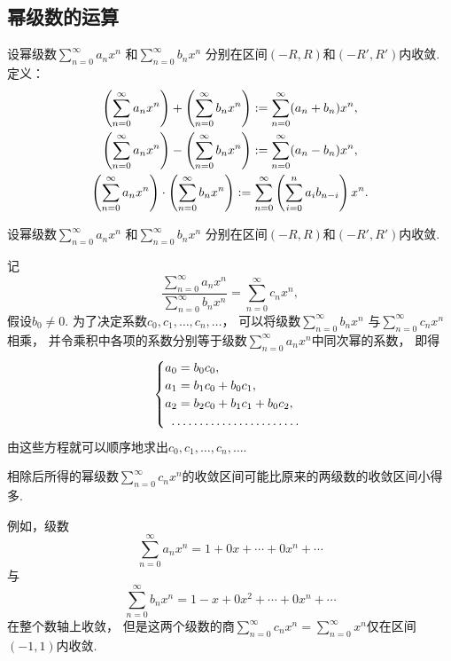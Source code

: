 \subsection{幂级数的运算}
\begin{definition}
设幂级数\(\sum_{n=0}^\infty a_n x^n\)
和\(\sum_{n=0}^\infty b_n x^n\)
分别在区间\((-R,R)\)和\((-R',R')\)内收敛.
定义：
\begin{gather}
	\left(\sum_{n=0}^\infty a_n x^n\right)
	+ \left(\sum_{n=0}^\infty b_n x^n\right)
	:=
	\sum_{n=0}^\infty (a_n+b_n) x^n, \\
	\left(\sum_{n=0}^\infty a_n x^n\right)
	- \left(\sum_{n=0}^\infty b_n x^n\right)
	:=
	\sum_{n=0}^\infty (a_n-b_n) x^n, \\
	\left(\sum_{n=0}^\infty a_n x^n\right)
	\cdot \left(\sum_{n=0}^\infty b_n x^n\right)
	:=
	\sum_{n=0}^\infty \left(
		\sum_{i=0}^n a_i b_{n-i}
	\right) x^n.
\end{gather}
\end{definition}

\begin{definition}
设幂级数\(\sum_{n=0}^\infty a_n x^n\)
和\(\sum_{n=0}^\infty b_n x^n\)
分别在区间\((-R,R)\)和\((-R',R')\)内收敛.

记\begin{equation*}
	\frac{
		\sum_{n=0}^\infty a_n x^n
	}{
		\sum_{n=0}^\infty b_n x^n
	}
	= \sum_{n=0}^\infty c_n x^n,
\end{equation*}
假设\(b_0 \neq 0\).
为了决定系数\(c_0,c_1,\dotsc,c_n,\dotsc\)，
可以将级数\(\sum_{n=0}^\infty b_n x^n\)
与\(\sum_{n=0}^\infty c_n x^n\)相乘，
并令乘积中各项的系数分别等于级数\(\sum_{n=0}^\infty a_n x^n\)中同次幂的系数，
即得\begin{equation*}
	\begin{cases}
		a_0 = b_0 c_0, \\
		a_1 = b_1 c_0 + b_0 c_1, \\
		a_2 = b_2 c_0 + b_1 c_1 + b_0 c_2, \\
		\hdotsfor{1} \\
	\end{cases}
\end{equation*}
由这些方程就可以顺序地求出\(c_0,c_1,\dotsc,c_n,\dotsc\).

相除后所得的幂级数\(\sum_{n=0}^\infty c_n x^n\)的收敛区间可能比原来的两级数的收敛区间小得多.
\end{definition}

例如，级数\begin{equation*}
	\sum_{n=0}^\infty a_n x^n
	= 1 + 0x + \dotsb + 0x^n + \dotsb
\end{equation*}与\begin{equation*}
	\sum_{n=0}^\infty b_n x^n
	= 1 - x + 0x^2 + \dotsb + 0x^n + \dotsb
\end{equation*}在整个数轴上收敛，
但是这两个级数的商\(\sum_{n=0}^\infty c_n x^n
= \sum_{n=0}^\infty x^n\)仅在区间\((-1,1)\)内收敛.
